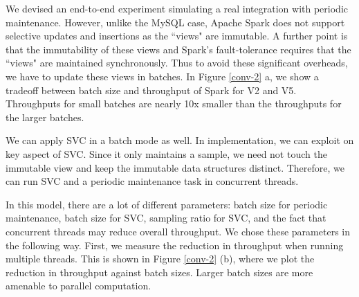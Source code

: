 We devised an end-to-end experiment simulating a real integration with periodic maintenance.
However, unlike the MySQL case, Apache Spark  does not support selective updates and insertions as the ``views" are immutable.
A further point is that the immutability of these views and Spark's fault-tolerance requires that the ``views" are maintained synchronously.
Thus to avoid these significant overheads, we have to update these views in batches.
In Figure \ref{conv-2} a, we show a tradeoff between batch size and throughput of Spark for V2 and V5.
Throughputs for small batches are nearly 10x smaller than the throughputs for the larger batches. 

We can apply SVC in a batch mode as well.
In implementation, we can exploit on key aspect of SVC.
Since it only maintains a sample, we need not touch the immutable view and keep the immutable data structures
distinct.
Therefore, we can run SVC and a periodic maintenance task in concurrent threads.


In this model, there are a lot of different parameters: batch size for periodic maintenance, batch size for SVC, sampling ratio for SVC, and the fact that concurrent threads may reduce overall throughput.
We chose these parameters in the following way. 
First, we measure the reduction in throughput when running multiple threads.
This is shown in Figure \ref{conv-2} (b), where we plot the reduction in throughput against batch sizes.
Larger batch sizes are more amenable to parallel computation. 

